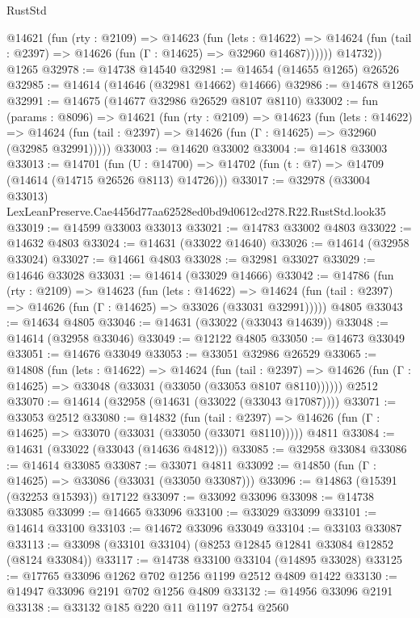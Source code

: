 \begin{lexlean}{RustStd}
\begin{coremodule}
          @14621
            (fun (rty : @2109) =>
            @14623
              (fun (lets : @14622) =>
              @14624 (fun (tail : @2397) => @14626 (fun (Γ : @14625) => @32960 @14687))))))
        @14732))
    @1265
@32978 := @14738 @14540
@32981 := @14654 (@14655 @1265) @26526
@32985 := @14614 (@14646 (@32981 @14662) @14666)
@32986 := @14678 @1265
@32991 := @14675 (@14677 @32986 @26529 @8107 @8110)
@33002 := fun (params : @8096) =>
  @14621
    (fun (rty : @2109) =>
    @14623
      (fun (lets : @14622) =>
      @14624 (fun (tail : @2397) => @14626 (fun (Γ : @14625) => @32960 (@32985 @32991)))))
@33003 := @14620 @33002
@33004 := @14618 @33003
@33013 := @14701
    (fun (U : @14700) => @14702 (fun (t : @7) => @14709 (@14614 (@14715 @26526 @8113) @14726)))
@33017 := @32978
    (@33004 @33013)
    LexLeanPreserve.Cae4456d77aa62528ed0bd9d0612cd278.R22.RustStd.look35
@33019 := @14599 @33003 @33013
@33021 := @14783 @33002 @4803
@33022 := @14632 @4803
@33024 := @14631 (@33022 @14640)
@33026 := @14614 (@32958 @33024)
@33027 := @14661 @4803
@33028 := @32981 @33027
@33029 := @14646 @33028
@33031 := @14614 (@33029 @14666)
@33042 := @14786
    (fun (rty : @2109) =>
    @14623
      (fun (lets : @14622) =>
      @14624 (fun (tail : @2397) => @14626 (fun (Γ : @14625) => @33026 (@33031 @32991)))))
    @4805
@33043 := @14634 @4805
@33046 := @14631 (@33022 (@33043 @14639))
@33048 := @14614 (@32958 @33046)
@33049 := @12122 @4805
@33050 := @14673 @33049
@33051 := @14676 @33049
@33053 := @33051 @32986 @26529
@33065 := @14808
    (fun (lets : @14622) =>
    @14624
      (fun (tail : @2397) =>
      @14626 (fun (Γ : @14625) => @33048 (@33031 (@33050 (@33053 @8107 @8110))))))
    @2512
@33070 := @14614 (@32958 (@14631 (@33022 (@33043 @17087))))
@33071 := @33053 @2512
@33080 := @14832
    (fun (tail : @2397) => @14626 (fun (Γ : @14625) => @33070 (@33031 (@33050 (@33071 @8110)))))
    @4811
@33084 := @14631 (@33022 (@33043 (@14636 @4812)))
@33085 := @32958 @33084
@33086 := @14614 @33085
@33087 := @33071 @4811
@33092 := @14850 (fun (Γ : @14625) => @33086 (@33031 (@33050 @33087)))
@33096 := @14863 (@15391 (@32253 @15393)) @17122
@33097 := @33092 @33096
@33098 := @14738 @33085
@33099 := @14665 @33096
@33100 := @33029 @33099
@33101 := @14614 @33100
@33103 := @14672 @33096 @33049
@33104 := @33103 @33087
@33113 := @33098 (@33101 @33104) (@8253 @12845 @12841 @33084 @12852 (@8124 @33084))
@33117 := @14738 @33100 @33104 (@14895 @33028)
@33125 := @17765 @33096 @1262 @702 @1256 @1199 @2512 @4809 @1422
@33130 := @14947 @33096 @2191 @702 @1256 @4809
@33132 := @14956 @33096 @2191
@33138 := @33132 @185 @220 @11 @1197 @2754 @2560

\end{coremodule}
\end{lexlean}
